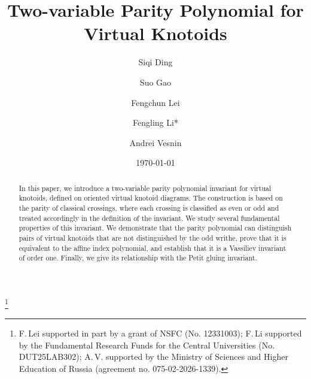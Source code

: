 \documentclass[12pt]{amsart}
\theoremstyle{noparens}
\numberwithin{equation}{section}
\numberwithin{equation}{section}
\begin{document}
	
\title[Two-variable Parity Polynomial for Virtual Knotoids]{Two-variable Parity Polynomial for Virtual Knotoids}
	
\author{Siqi Ding}
\address{School of Mathematical Sciences, Dalian University of Technology, Dalian 116024, P. R. China}

\author{Suo Gao}
\address{School of Information Science and Engineering, Dalian Polytechnic University, Dalian 116034, China}

\author{Fengchun Lei}
\address{Beijing Institute of Mathematical Sciences and Applications, Beijing 101408, P.R. China; School of Mathematical Sciences, Dalian University of Technology, Dalian 116024, P.R. China. }
	
\author{Fengling Li*}
\address{School of Mathematical Sciences, Dalian University of Technology, Dalian 116024, P. R. China}
	
\author{Andrei Vesnin}
\address{Sobolev Institute of Mathematics of the Siberian Branch of the Russian Academy of Sciences, Novosibirsk 630090, Russia; Regional Scientific and Educational Mathematical Center, Tomsk State University, Tomsk, 634050, Russia}

\thanks{F.\,Lei supported in part by a grant of NSFC (No. 12331003); F.\,Li supported by the Fundamental Research Funds for the Central Universities (No. DUT25LAB302); A.\,V. supported by the Ministry of Sciences and Higher Education of Russia (agreement no. 075-02-2026-1339).}

\date{\today} 
	

	
\begin{abstract}
In this paper, we introduce a two-variable parity polynomial invariant for virtual knotoids, defined on oriented virtual knotoid diagrams. The construction is based on the parity of classical crossings, where each crossing is classified as even or odd and treated accordingly in the definition of the invariant. We study several fundamental properties of this invariant. We demonstrate that the parity polynomial can distinguish pairs of virtual knotoids that are not distinguished by the odd writhe, prove that it is equivalent to the affine index polynomial, and establish that it is a Vassiliev invariant of order one. Finally, we give its relationship with the Petit gluing invariant. 
\end{abstract}
\maketitle
\end{document}
